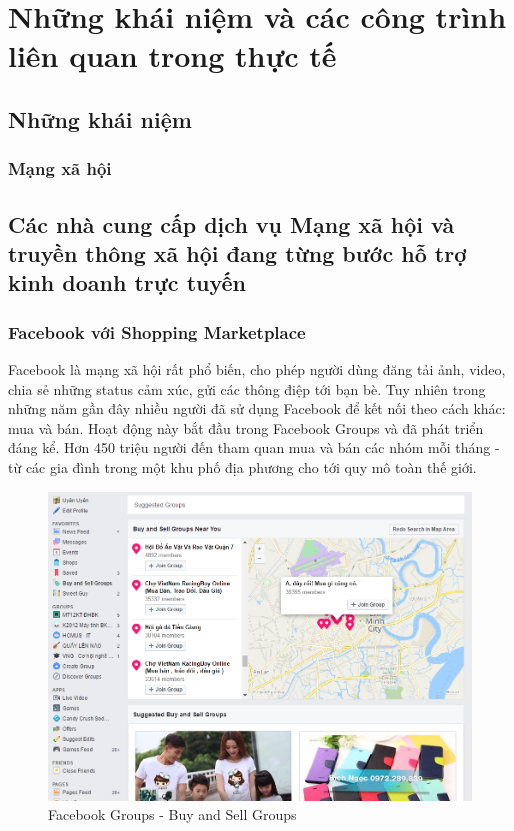 \chapter{Những khái niệm và các công trình liên quan trong thực tế}

\section{Những khái niệm}
\subsection{Mạng xã hội}
\section{Các nhà cung cấp dịch vụ Mạng xã hội và truyền thông xã hội đang từng bước hỗ trợ kinh doanh trực tuyến}
\subsection{Facebook với Shopping Marketplace}

Facebook là mạng xã hội rất phổ biến, cho phép người dùng đăng tải ảnh, video, chia sẻ những status cảm xúc, gửi các thông điệp tới bạn bè. Tuy nhiên trong những năm gần đây nhiều người đã sử dụng Facebook để kết nối theo cách khác: mua và bán. Hoạt động này bắt đầu trong Facebook Groups và đã phát triển đáng kể. Hơn 450 triệu người đến tham quan mua và bán các nhóm mỗi tháng - từ các gia đình trong một khu phố địa phương cho tới quy mô toàn thế giới.

\begin{figure}[H]
	\centering
	\includegraphics[scale=.5]{img/fb-group-buy.PNG} 
	\caption{Facebook Groups - Buy and Sell Groups}
\end{figure}

